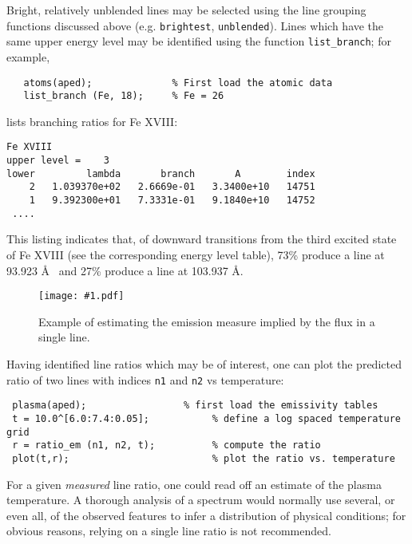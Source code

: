 \documentclass{book}
\newcommand{\putfig}[1]{\texttt{[image: \#1.pdf]}}
\newcommand{\putfig}[1]{\psfig{file=#1.ps}}
\begin{document}
{Bright, relatively unblended lines may be selected using the line grouping
functions discussed above (e.g. {\tt brightest}, {\tt unblended}).  Lines
which have the same upper energy level may be identified
using the function {\tt list\_branch}; for example,
\begin{verbatim}
   atoms(aped);              % First load the atomic data
   list_branch (Fe, 18);     % Fe = 26
\end{verbatim}
lists branching ratios for Fe XVIII:
\begin{verbatim}
Fe XVIII
upper level =    3
lower         lambda       branch       A        index
    2   1.039370e+02   2.6669e-01   3.3400e+10   14751
    1   9.392300e+01   7.3331e-01   9.1840e+10   14752
 ....
\end{verbatim}
This listing indicates that, of downward transitions from the third
excited state of Fe XVIII (see the corresponding energy level table),
73\% produce a line at 93.923 \AA~ and 27\% produce a line at 103.937 \AA.

\begin{figure}[ht]
\putfig{figures/crude_dem}
\caption{Example of estimating the emission measure implied by the flux in a
single line.}
\label{fig:crude_dem}
\end{figure}

Having identified line ratios which may be of interest, one can plot the
predicted ratio of two lines with indices {\tt n1} and {\tt n2} vs
temperature:

 \begin{verbatim}
 plasma(aped);                 % first load the emissivity tables
 t = 10.0^[6.0:7.4:0.05];           % define a log spaced temperature grid
 r = ratio_em (n1, n2, t);          % compute the ratio
 plot(t,r);                         % plot the ratio vs. temperature
 \end{verbatim}

For a given {\it measured} line ratio, one could read off an estimate of the
plasma temperature.  A thorough analysis of a spectrum would normally use
several, or even all, of the observed features to infer a distribution of
physical conditions; for obvious reasons, relying on a single line ratio is
not recommended.

}
\end{document}
